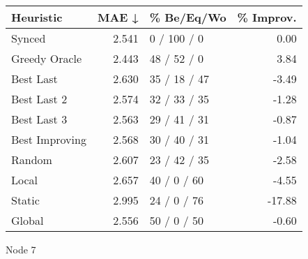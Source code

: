 \begin{tabular}{lrlr}
\toprule
\textbf{Heuristic} & \textbf{MAE ↓} & \textbf{\% Be/Eq/Wo} & \textbf{\% Improv.} \\
\midrule
            Synced &          2.541 &          0 / 100 / 0 &                0.00 \\
     Greedy Oracle &          2.443 &          48 / 52 / 0 &                3.84 \\
         Best Last &          2.630 &         35 / 18 / 47 &               -3.49 \\
       Best Last 2 &          2.574 &         32 / 33 / 35 &               -1.28 \\
       Best Last 3 &          2.563 &         29 / 41 / 31 &               -0.87 \\
    Best Improving &          2.568 &         30 / 40 / 31 &               -1.04 \\
            Random &          2.607 &         23 / 42 / 35 &               -2.58 \\
             Local &          2.657 &          40 / 0 / 60 &               -4.55 \\
            Static &          2.995 &          24 / 0 / 76 &              -17.88 \\
            Global &          2.556 &          50 / 0 / 50 &               -0.60 \\
\bottomrule
\end{tabular}
\caption{Node 7}
\label{tab:hr_iid_lr05_le2_bs2_7}
